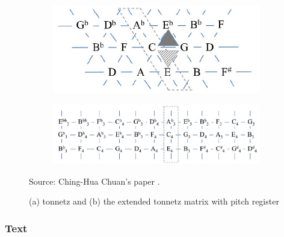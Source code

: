 \documentclass[12pt]{report}
\begin{document}
\begin{figure}[h]
    \centering
    \newlength{\MyOtherHeightThree}
    \begin{subfigure}[t]{0.38\textwidth}
        \centering
        \includegraphics[width=\textwidth]{images/music/pianoroll/tonnetz.jpg}
        \caption{}
        \label{fig:tonnetz}
    \end{subfigure}
    \hfill
    \begin{subfigure}[t]{0.6\textwidth}
        \centering
        \includegraphics[width=\textwidth]{images/music/pianoroll/tonnetz_extended.jpg}
        \caption{}
        \label{fig:tonnetz_extended}
    \end{subfigure}
    \caption{(a) tonnetz and (b) the extended tonnetz matrix with pitch register}
    Source: Ching-Hua Chuan's paper \cite{chuan_modeling_nodate}.
    \label{fig:tonnetz_representation}
\end{figure}

\subsubsection{Text}
\end{document}
